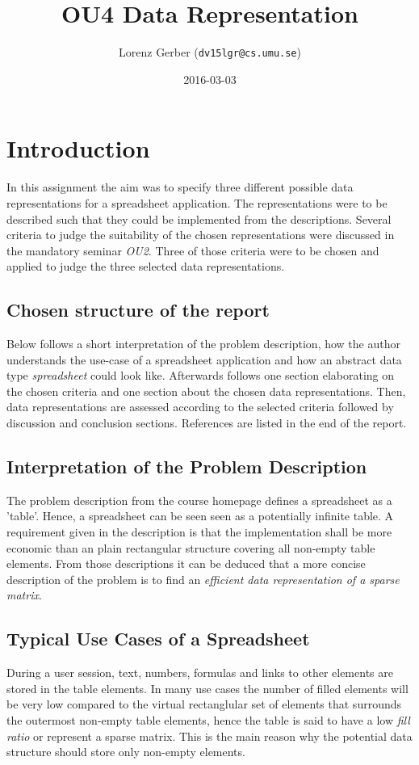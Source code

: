 \documentclass[a4paper,11pt,twoside]{article}
\title{OU4 Data Representation}
\author{Lorenz Gerber ({\tt{dv15lgr@cs.umu.se}})}
\date{2016-03-03}
\begin{document}
\lstset{language=C}
\maketitle
\thispagestyle{empty}
\newpage
\tableofcontents
\thispagestyle{empty}
\newpage

\clearpage
{}

\section{Introduction} 
In this assignment the aim was to specify three different possible
data representations for a spreadsheet application. The
representations were to be described such that they could be implemented
from the descriptions. Several criteria to judge the suitability of
the chosen representations were discussed in the mandatory seminar
\emph{OU2}. Three of those criteria were to be chosen and applied to judge the
three selected data representations.

\subsection{Chosen structure of the report}
Below follows a short interpretation of the problem description, how
the author understands the use-case of a spreadsheet application
and how an abstract data type \textit{spreadsheet} could look
like. Afterwards follows one section elaborating on the chosen
criteria and one section about the chosen data representations. Then,
data representations are assessed according to the selected criteria followed
by discussion and conclusion sections. References are listed in the
end of the report.


\subsection{Interpretation of the Problem Description}
The problem description from the course homepage defines a spreadsheet
as a 'table'. Hence, a spreadsheet can be seen seen as a potentially
infinite table. A requirement given in the description is that the
implementation shall be more economic than an plain rectangular
structure covering all non-empty table elements. From those
descriptions it can be deduced that a more concise description of
the problem is to find an \emph{efficient data representation of a
 sparse matrix}.


\subsection{Typical Use Cases of a Spreadsheet}
During a user session, text, numbers, formulas and links to
other elements are stored in the table elements. In many use cases the
number of filled elements will be very low compared to the virtual
rectanglular set of elements that surrounds the outermost non-empty
table elements, hence the table is said to have a low \emph{fill
 ratio} or represent a sparse matrix. This is the main reason why the
potential data structure should store only non-empty elements.
\end{document}
